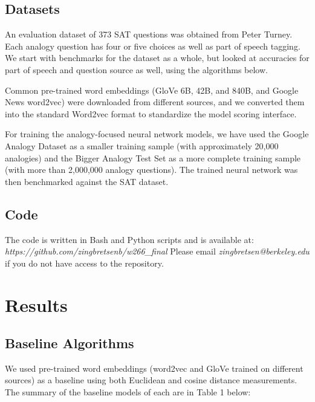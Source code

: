 \documentclass[11pt]{article}
\begin{document}
\subsection{Datasets}

An evaluation dataset of 373 SAT questions was obtained from Peter
Turney. Each analogy question has four or five choices as well as part
of speech tagging. We start with benchmarks for the dataset as a whole,
but looked at accuracies for part of speech and question source as well,
using the algorithms below.

Common pre-trained word embeddings (GloVe 6B, 42B, and 840B, and Google
News word2vec) were downloaded from different sources, and we converted
them into the standard Word2vec format to standardize the model scoring
interface.

For training the analogy-focused neural network models, we have used the
Google Analogy Dataset as a smaller training sample (with approximately
20,000 analogies) and the Bigger Analogy Test Set as a more complete
training sample (with more than 2,000,000 analogy questions). The
trained neural network was then benchmarked against the SAT dataset.

\subsection{Code}

The code is written in Bash and Python scripts and is available at: \emph{https://github.com/zingbretsenb/w266\_final}
Please email \emph{zingbretsen@berkeley.edu} if you do not have access to the repository.

\section{Results }

\subsection{Baseline Algorithms}

We used pre-trained word embeddings (word2vec and GloVe trained on
different sources) as a baseline using both Euclidean and cosine
distance measurements. The summary of the baseline models of each are in
Table 1 below:
\end{document}
